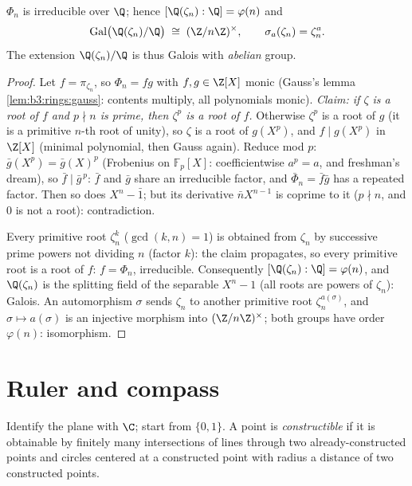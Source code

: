 \begin{theorem}\label{thm:b3:galois:cyclotomicirred}
$\Phi_n$ is irreducible over $\Q$; hence $[\Q(\zeta_n) : \Q] =
\varphi(n)$ and
\[
\operatorname{Gal}\bigl(\Q(\zeta_n)/\Q\bigr) \;\cong\;
(\Z/n\Z)^\times,
\qquad \sigma_a(\zeta_n) = \zeta_n^a .
\]
The extension $\Q(\zeta_n)/\Q$ is thus Galois with \emph{abelian}
group.
\end{theorem}

\begin{proof}
Let $f = \pi_{\zeta_n}$, so $\Phi_n = fg$ with $f, g \in \Z[X]$
monic (Gauss's lemma \cref{lem:b3:rings:gauss}: contents
multiply, all polynomials monic). \emph{Claim: if $\zeta$ is a
root of $f$ and $p \nmid n$ is prime, then $\zeta^p$ is a root
of $f$.} Otherwise $\zeta^p$ is a root of $g$ (it is a primitive
$n$-th root of unity), so $\zeta$ is a root of $g(X^p)$, and $f
\mid g(X^p)$ in $\Z[X]$ (minimal polynomial, then Gauss again).
Reduce mod $p$: $\bar g(X^p) = \bar g(X)^p$ (Frobenius on
$\mathbb F_p[X]$: coefficientwise $a^p = a$, and freshman's
dream), so $\bar f \mid \bar g^{\,p}$: $\bar f$ and $\bar g$
share an irreducible factor, and $\bar\Phi_n = \bar f\bar g$ has
a repeated factor. Then so does $X^n - \bar 1$; but its
derivative $\bar nX^{n-1}$ is coprime to it ($p \nmid n$, and
$0$ is not a root): contradiction.

Every primitive root $\zeta_n^k$ ($\gcd(k, n) = 1$) is obtained
from $\zeta_n$ by successive prime powers not dividing $n$
(factor $k$): the claim propagates, so every primitive root is a
root of $f$: $f = \Phi_n$, irreducible. Consequently
$[\Q(\zeta_n):\Q] = \varphi(n)$, and $\Q(\zeta_n)$ is the
splitting field of the separable $X^n - 1$ (all roots are powers
of $\zeta_n$): Galois. An automorphism $\sigma$ sends $\zeta_n$
to another primitive root $\zeta_n^{a(\sigma)}$, and $\sigma
\mapsto a(\sigma)$ is an injective morphism into
$(\Z/n\Z)^\times$; both groups have order $\varphi(n)$:
isomorphism.
\end{proof}

\section{Ruler and compass}

\begin{definition}\label{def:b3:galois:constructible}
Identify the plane with $\C$; start from $\{0, 1\}$. A point is
\emph{constructible} if it is
obtainable by finitely many intersections of lines through two
already-constructed points and circles centered at a constructed
point with radius a distance of two constructed points.
\end{definition}

